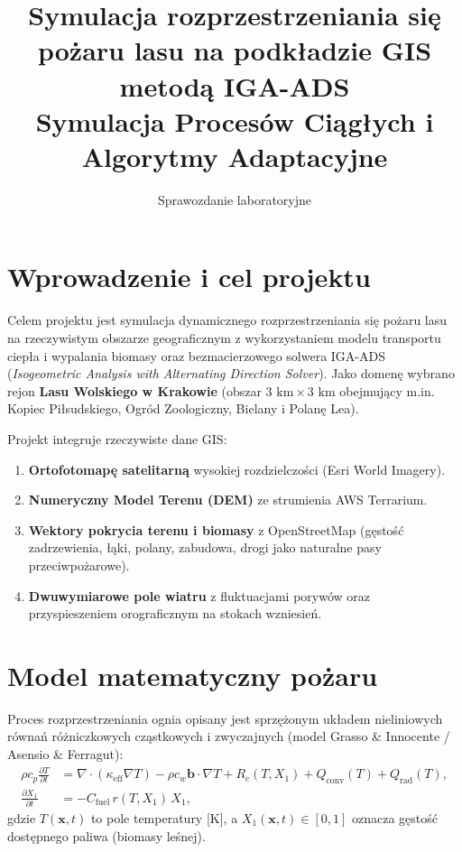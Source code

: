 \documentclass[11pt,a4paper]{article}
\title{\textbf{Symulacja rozprzestrzeniania się pożaru lasu na podkładzie GIS metodą IGA-ADS}\\
\large Symulacja Procesów Ciągłych i Algorytmy Adaptacyjne}
\author{Sprawozdanie laboratoryjne}
\date{}
\begin{document}
\maketitle

\section{Wprowadzenie i cel projektu}
Celem projektu jest symulacja dynamicznego rozprzestrzeniania się pożaru lasu na rzeczywistym obszarze geograficznym z wykorzystaniem modelu transportu ciepła i wypalania biomasy oraz bezmacierzowego solwera IGA-ADS (\emph{Isogeometric Analysis with Alternating Direction Solver}). Jako domenę wybrano rejon \textbf{Lasu Wolskiego w Krakowie} (obszar $3\text{ km} \times 3\text{ km}$ obejmujący m.in. Kopiec Piłsudskiego, Ogród Zoologiczny, Bielany i Polanę Lea). 

Projekt integruje rzeczywiste dane GIS:
\begin{enumerate}
    \item \textbf{Ortofotomapę satelitarną} wysokiej rozdzielczości (Esri World Imagery).
    \item \textbf{Numeryczny Model Terenu (DEM)} ze strumienia AWS Terrarium.
    \item \textbf{Wektory pokrycia terenu i biomasy} z OpenStreetMap (gęstość zadrzewienia, łąki, polany, zabudowa, drogi jako naturalne pasy przeciwpożarowe).
    \item \textbf{Dwuwymiarowe pole wiatru} z fluktuacjami porywów oraz przyspieszeniem orograficznym na stokach wzniesień.
\end{enumerate}

\section{Model matematyczny pożaru}
Proces rozprzestrzeniania ognia opisany jest sprzężonym układem nieliniowych równań różniczkowych cząstkowych i zwyczajnych (model Grasso \& Innocente / Asensio \& Ferragut):
\begin{align}
    \rho c_p \frac{\partial T}{\partial t} &= \nabla \cdot (\kappa_{\text{eff}} \nabla T) - \rho c_w \mathbf{b} \cdot \nabla T + R_c(T, X_1) + Q_{\text{conv}}(T) + Q_{\text{rad}}(T), \label{eq:heat} \\
    \frac{\partial X_1}{\partial t} &= - C_{\text{fuel}} \, r(T, X_1) \, X_1, \label{eq:fuel}
\end{align}
gdzie $T(\mathbf{x}, t)$ to pole temperatury [K], a $X_1(\mathbf{x}, t) \in [0, 1]$ oznacza gęstość dostępnego paliwa (biomasy leśnej).
\end{document}
